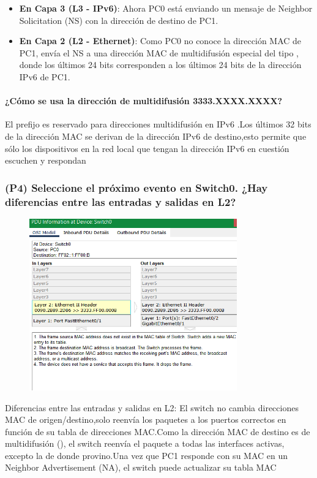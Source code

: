 \documentclass{article}
\begin{document}
\begin{itemize}
\item \textbf{En Capa 3 (L3 - IPv6)}: Ahora PC0 está enviando un mensaje de Neighbor Solicitation (NS) con la dirección de destino de PC1.
\item \textbf{En Capa 2 (L2 - Ethernet)}: Como PC0 no conoce la dirección MAC de PC1, envía el NS a una dirección MAC de multidifusión especial del tipo , donde los últimos 24 bits corresponden a los últimos 24 bits de la dirección IPv6 de PC1.
\end{itemize}

\paragraph*{¿Cómo se usa la dirección de multidifusión 3333.XXXX.XXXX?}
El prefijo  es reservado para direcciones multidifusión en IPv6
.Los últimos 32 bits de la dirección MAC se derivan de la dirección IPv6 de destino,esto permite que sólo los dispositivos en la red local que tengan la dirección IPv6 en cuestión escuchen y respondan


\subsubsection*{(P4)  Seleccione el próximo evento en Switch0. ¿Hay diferencias entre las entradas y salidas en L2?}
\begin{figure}[h]
    \centering
    \includegraphics[width=0.8\textwidth]{16.png}
\end{figure}

Diferencias entre las entradas y salidas en L2:
El switch no cambia direcciones MAC de origen/destino,solo reenvía los paquetes a los puertos correctos en función de su tabla de direcciones MAC.Como la dirección MAC de destino es de multidifusión (), el switch reenvía el paquete a todas las interfaces activas, excepto la de donde provino.Una vez que PC1 responde con su MAC en un Neighbor Advertisement (NA), el switch puede actualizar su tabla MAC
\end{document}
